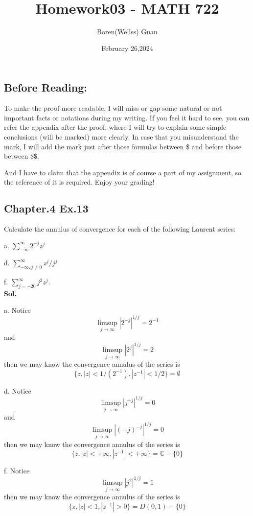 \documentclass[lang=en,11pt,a4paper,citestyle =authoryear]{elegantpaper}
\title{Homework03 - MATH 722}
\author{Boren(Wellss) Guan}
\date{February 26,2024}
\newcommand{\C}{\mathbb{C}}
\begin{document}
\maketitle

\subsection*{Before Reading:}\par
To make the proof more readable, I will miss or gap some natural or not important facts or notations during my writing. If you feel it hard to see, you can refer the appendix after the proof, where I will try to explain some simple conclusions (will be marked) more clearly. In case that you misunderstand the mark, I will add the mark just after those formulas between \$ and before those between \$\$.\par
And I have to claim that the appendix is of course a part of my assignment, so the reference of it is required. Enjoy your grading!

\subsection*{Chapter.4 Ex.13} 
Calculate the annulus of convergence for each of the following Laurent series:\par
a. $\sum_{-\infty}^{\infty}2^{-j}z^j$\par
d. $\sum_{-\infty,j\neq 0}^{\infty} z^j/j^j$\par
f. $\sum_{j=-20}^{\infty} j^2z^j$.
\vspace{0.5em}\\
\textbf{Sol.} \par
a. Notice
\[
\limsup_{j\to\infty} |2^{-j}|^{1/j} = 2^{-1}
\]
and
\[
\limsup_{j\to\infty} |2^{j}|^{1/j} = 2
\]
then we may know the convergence annulus of the series is
\[
\{z, |z|<1/(2^{-1}), |z^{-1}| < 1/2\} = \emptyset
\]\par
d. Notice
\[
\limsup_{j\to\infty} |j^{-j}|^{1/j} = 0
\]
and
\[
\limsup_{j\to\infty} |(-j)^{-j}|^{1/j} = 0
\]
then we may know the convergence annulus of the series is
\[
\{z, |z|<+\infty, |z^{-1}| < +\infty\} = \C-\{0\}
\]\par
f. Notice
\[
\limsup_{j\to\infty} |j^2|^{1/j} = 1
\]
then we may know the convergence annulus of the series is
\[
\{z, |z|<1, |z^{-1}| > 0\} = D(0,1)-\{0\}
\]\par
\vspace{0.5em}
\end{document}

